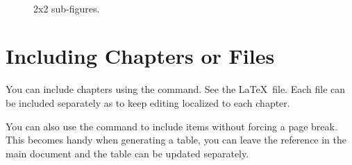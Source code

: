 \documentclass[12pt]{report}
\begin{document}
\begin{figure}[!t]
   \centering
    \quad
   \\
   \caption{2x2 sub-figures.}
   \label{fig:2x2_subfigs}
\end{figure}

\section{Including Chapters or Files}
You can include chapters using the \verb'' command. See the \LaTeX\ file.  Each file can be included separately as to keep editing localized to each chapter.
%
%

You can also use the \verb'' command to include items without forcing a page break.  This becomes handy when generating a table, you can leave the reference in the main document and the table can be updated separately.

\end{document}

